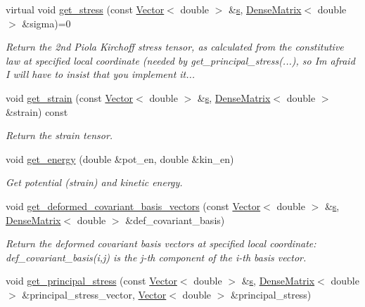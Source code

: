 \begin{DoxyCompactItemize}
virtual void \hyperlink{classoomph_1_1PVDEquationsBase_ad429d68f0129d5f7a38705aab386daa5}{get\+\_\+stress} (const \hyperlink{classoomph_1_1Vector}{Vector}$<$ double $>$ \&\hyperlink{cfortran_8h_ab7123126e4885ef647dd9c6e3807a21c}{s}, \hyperlink{classoomph_1_1DenseMatrix}{Dense\+Matrix}$<$ double $>$ \&sigma)=0
\begin{DoxyCompactList}\small\item\em Return the 2nd Piola Kirchoff stress tensor, as calculated from the constitutive law at specified local coordinate (needed by {\ttfamily get\+\_\+principal\+\_\+stress}(...), so I\textquotesingle{}m afraid I will have to insist that you implement it... \end{DoxyCompactList}\item 
void \hyperlink{classoomph_1_1PVDEquationsBase_a8fa551e7ac975affcf3bc281262a6849}{get\+\_\+strain} (const \hyperlink{classoomph_1_1Vector}{Vector}$<$ double $>$ \&\hyperlink{cfortran_8h_ab7123126e4885ef647dd9c6e3807a21c}{s}, \hyperlink{classoomph_1_1DenseMatrix}{Dense\+Matrix}$<$ double $>$ \&strain) const
\begin{DoxyCompactList}\small\item\em Return the strain tensor. \end{DoxyCompactList}\item 
void \hyperlink{classoomph_1_1PVDEquationsBase_a117549617e09065f0186e79cf9470e09}{get\+\_\+energy} (double \&pot\+\_\+en, double \&kin\+\_\+en)
\begin{DoxyCompactList}\small\item\em Get potential (strain) and kinetic energy. \end{DoxyCompactList}\item 
void \hyperlink{classoomph_1_1PVDEquationsBase_a8b8ea33a48438f2414e28651b5b28a0f}{get\+\_\+deformed\+\_\+covariant\+\_\+basis\+\_\+vectors} (const \hyperlink{classoomph_1_1Vector}{Vector}$<$ double $>$ \&\hyperlink{cfortran_8h_ab7123126e4885ef647dd9c6e3807a21c}{s}, \hyperlink{classoomph_1_1DenseMatrix}{Dense\+Matrix}$<$ double $>$ \&def\+\_\+covariant\+\_\+basis)
\begin{DoxyCompactList}\small\item\em Return the deformed covariant basis vectors at specified local coordinate\+: {\ttfamily def\+\_\+covariant\+\_\+basis(i,j)} is the j-\/th component of the i-\/th basis vector. \end{DoxyCompactList}\item 
void \hyperlink{classoomph_1_1PVDEquationsBase_a33ee6b6df8c9f3fbe9485d95db6c362d}{get\+\_\+principal\+\_\+stress} (const \hyperlink{classoomph_1_1Vector}{Vector}$<$ double $>$ \&\hyperlink{cfortran_8h_ab7123126e4885ef647dd9c6e3807a21c}{s}, \hyperlink{classoomph_1_1DenseMatrix}{Dense\+Matrix}$<$ double $>$ \&principal\+\_\+stress\+\_\+vector, \hyperlink{classoomph_1_1Vector}{Vector}$<$ double $>$ \&principal\+\_\+stress)

\end{DoxyCompactItemize}

